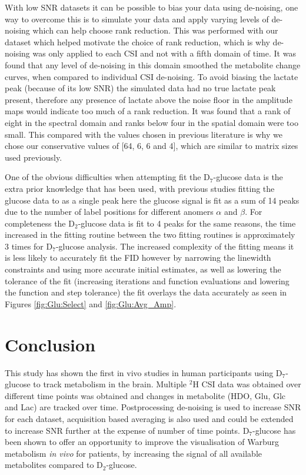 \documentclass[class=article, crop=false]{standalone}
\begin{document}
With low SNR datasets it can be possible to bias your data using de-noising, one way to overcome this is to simulate your data and apply varying levels of de-noising which can help choose rank reduction. This was performed with our dataset which helped motivate the choice of rank reduction, which is why de-noising was only applied to each CSI and not with a fifth domain of time. It was found that any level of de-noising in this domain smoothed the metabolite change curves, when compared to individual CSI de-noising. To avoid biasing the lactate peak (because of its low SNR) the simulated data had no true lactate peak present, therefore any presence of lactate above the noise floor in the amplitude maps would indicate too much of a rank reduction. It was found that a rank of eight in the spectral domain and ranks below four in the spatial domain were too small. This compared with the values chosen in previous literature is why we chose our conservative values of [64, 6, 6 and 4], which are similar to matrix sizes used previously\cite{vonMorze2021ComparisonT, Kreis2020MeasuringMRI}. 

One of the obvious difficulties when attempting fit the D$_7$-glucose data is the extra prior knowledge that has been used, with previous studies fitting the glucose data to as a single peak here the glucose signal is fit as a sum of 14 peaks due to the number of label positions for different anomers $\alpha$ and $\beta$. For completeness the D$_2$-glucose data is fit to 4 peaks for the same reasons, the time increased in the fitting routine between the two fitting routines is approximately 3 times for D$_7$-glucose analysis. The increased complexity of the fitting means it is less likely to accurately fit the FID however by narrowing the linewidth constraints and using more accurate initial estimates, as well as lowering the tolerance of the fit (increasing iterations and function evaluations and lowering the function and step tolerance) the fit overlays the data accurately as seen in Figures \ref{fig:Glu:Select} and \ref{fig:Glu:Avg_Amp}. 

\section{Conclusion}

This study has shown the first in vivo studies in human participants using D$_7$-glucose to track metabolism in the brain. Multiple $^2$H CSI data was obtained over different time points was obtained and changes in metabolite (HDO, Glu, Glc and Lac) are tracked over time. Postprocessing de-noising is used to increase SNR for each dataset, acquisition based averaging is also used and could be extended to increase SNR further at the expense of number of time points. D$_7$-glucose has been shown to offer an opportunity to improve the visualisation of Warburg metabolism \textit{in vivo} for patients, by increasing the signal of all available metabolites compared to D$_2$-glucose. 

\end{document}
